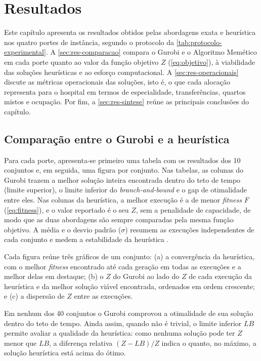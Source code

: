 \chapter{Resultados}
\label{cap:resultados}

Este capítulo apresenta os resultados obtidos pelas abordagens exata e heurística nos quatro portes de instância, segundo o protocolo da \autoref{tab:protocolo-experimental}. A \autoref{sec:res-comparacao} compara o Gurobi e o Algoritmo Memético em cada porte quanto ao valor da função objetivo $Z$ (\autoref{eq:objetivo}), à viabilidade das soluções heurísticas e ao esforço computacional. A \autoref{sec:res-operacionais} discute as métricas operacionais das soluções, isto é, o que cada alocação representa para o hospital em termos de especialidade, transferências, quartos mistos e ocupação. Por fim, a \autoref{sec:res-sintese} reúne as principais conclusões do capítulo.

\section{Comparação entre o Gurobi e a heurística}
\label{sec:res-comparacao}

Para cada porte, apresenta-se primeiro uma tabela com os resultados dos 10 conjuntos e, em seguida, uma figura por conjunto. Nas tabelas, as colunas do Gurobi trazem a melhor solução inteira encontrada dentro do teto de tempo (limite superior), o limite inferior do \textit{branch-and-bound} e o gap de otimalidade entre eles. Nas colunas da heurística, a melhor execução é a de menor \textit{fitness} $F$ (\autoref{eq:fitness}), e o valor reportado é o seu $Z$, sem a penalidade de capacidade, de modo que as duas abordagens são sempre comparadas pela mesma função objetivo. A média e o desvio padrão ($\sigma$) resumem as execuções independentes de cada conjunto e medem a estabilidade da heurística \cite{talbi2009metaheuristics}.

Cada figura reúne três gráficos de um conjunto: (a) a convergência da heurística, com o melhor \textit{fitness} encontrado até cada geração em todas as execuções e a melhor delas em destaque; (b) o $Z$ do Gurobi ao lado do $Z$ de cada execução da heurística e da melhor solução viável encontrada, ordenados em ordem crescente; e (c) a dispersão de $Z$ entre as execuções.

Em nenhum dos 40 conjuntos o Gurobi comprovou a otimalidade de sua solução dentro do teto de tempo. Ainda assim, quando não é trivial, o limite inferior $LB$ permite avaliar a qualidade da heurística: como nenhuma solução pode ter $Z$ menor que $LB$, a diferença relativa $(Z - LB)/Z$ indica o quanto, no máximo, a solução heurística está acima do ótimo.

